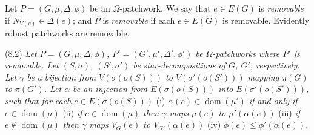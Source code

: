 Let $P = (G, \mu, \Delta, \phi)$ be an $\Omega$-patchwork. We say that $e \in E(G)$ is \textit{removable} if $N_{V(e)} \in \Delta(e)$; and $P$ is \textit{removable} if each $e \in E(G)$ is removable. Evidently robust patchworks are removable.

\stmt
(8.2) \textit{Let $P = (G, \mu, \Delta, \phi)$, $P' = (G', \mu', \Delta', \phi')$ be $\Omega$-patchworks where $P'$ is removable. Let $(S, \sigma)$, $(S', \sigma')$ be star-decompositions of $G$, $G'$, respectively. Let $\gamma$ be a bijection from $V(\sigma(o(S)))$ to $V(\sigma'(o(S')))$ mapping $\pi(G)$ to $\pi(G')$. Let $\alpha$ be an injection from $E(\sigma(o(S)))$ into $E(\sigma'(o(S')))$, such that for each $e \in E(\sigma(o(S)))$} (i) \textit{$\alpha(e) \in \operatorname{dom}(\mu')$ if and only if $e \in \operatorname{dom}(\mu)$} (ii) \textit{if $e \in \operatorname{dom}(\mu)$ then $\gamma$ maps $\mu(e)$ to $\mu'(\alpha(e))$} (iii) \textit{if $e \notin \operatorname{dom}(\mu)$ then $\gamma$ maps $V_G(e)$ to $V_{G'}(\alpha(e))$} (iv) \textit{$\phi(e) \le \phi'(\alpha(e))$.}
